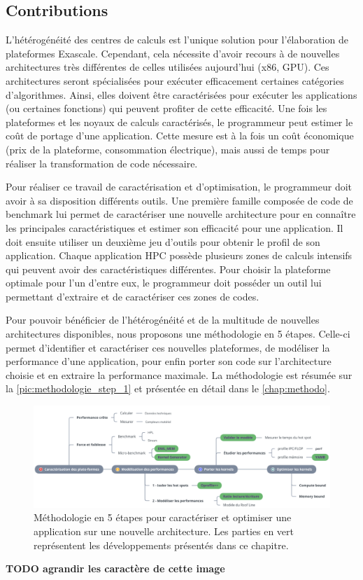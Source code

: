  

\subsection{Contributions}

    L'hétérogénéité des centres de calculs est l'unique solution pour l'élaboration de plateformes Exascale. Cependant, cela nécessite d'avoir recours à de nouvelles architectures très différentes de celles utilisées aujourd'hui (x86, GPU). Ces architectures seront spécialisées pour exécuter efficacement certaines catégories d'algorithmes. Ainsi, elles doivent être caractérisées pour exécuter les applications (ou certaines fonctions) qui peuvent profiter de cette efficacité. Une fois les plateformes et les noyaux de calculs caractérisés, le programmeur peut estimer le coût de portage d'une application. Cette mesure est à la fois un coût économique (prix de la plateforme, consommation électrique), mais aussi de temps pour réaliser la transformation de code nécessaire.
    
    Pour réaliser ce travail de caractérisation et d'optimisation, le programmeur doit avoir à sa disposition différents outils. Une première famille composée de code de benchmark lui permet de caractériser une nouvelle architecture pour en connaître les principales caractéristiques et estimer son efficacité pour une application. 
    Il doit ensuite utiliser un deuxième jeu d'outils pour obtenir le profil de son application. Chaque application HPC possède plusieurs zones de calculs intensifs qui peuvent avoir des caractéristiques différentes. Pour choisir la plateforme optimale pour l'un d'entre eux, le programmeur doit posséder un outil lui permettant d'extraire et de caractériser ces zones de codes.
    
    Pour pouvoir bénéficier de l'hétérogénéité et de la multitude de nouvelles architectures disponibles, nous proposons une méthodologie en 5 étapes. Celle-ci permet d'identifier et caractériser ces nouvelles plateformes, de modéliser la performance d'une application, pour enfin porter son code sur l'architecture choisie et en extraire la performance maximale. La méthodologie est résumée sur la \autoref{pic:methodologie_step_1} et présentée en détail dans le \autoref{chap:methodo}.

    \begin{figure}[h!]
    \center
    \includegraphics[width=\linewidth]{images/methodologie_step.png}
    \caption{\label{pic:methodologie_step_1} Méthodologie en 5 étapes pour caractériser et optimiser une application sur une nouvelle architecture. Les parties en vert représentent les développements présentés dans ce chapitre.}
    \end{figure}
    \textbf{TODO agrandir les caractère de cette image}
    
